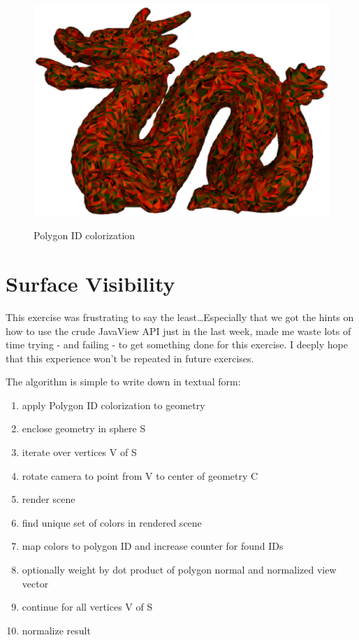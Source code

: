 \documentclass[a4paper,10pt,notitlepage]{scrreprt}
\begin{document}
\begin{figure}
{            \includegraphics[scale=0.4]{dragon-polygonid.eps} }

  \caption{Polygon ID colorization}
\end{figure}

\pagebreak

\section{Surface Visibility}

This exercise was frustrating to say the least\dots Especially that we got the
hints on how to use the crude JavaView API just in the last week, made me waste
lots of time trying - and failing - to get something done for this exercise. I
deeply hope that this experience won't be repeated in future exercises.

The algorithm is simple to write down in textual form:

\begin{enumerate}
 \item apply Polygon ID colorization to geometry
 \item enclose geometry in sphere S
 \item iterate over vertices V of S
 \item rotate camera to point from V to center of geometry C
 \item render scene
 \item find unique set of colors in rendered scene
 \item map colors to polygon ID and increase counter for found IDs
 \item optionally weight by dot product of polygon normal and normalized view
vector
 \item continue for all vertices V of S
 \item normalize result
\end{enumerate}
\end{document}
